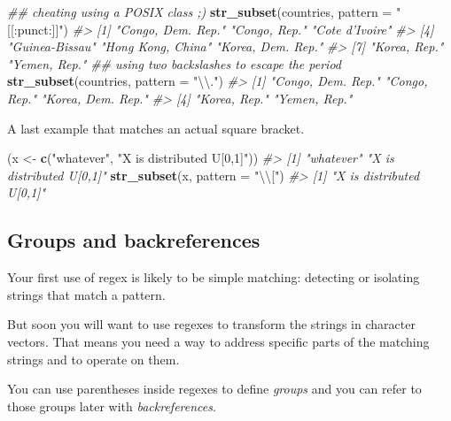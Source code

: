 \documentclass[
]{book}
\newenvironment{Shaded}{\begin{snugshade}}{\end{snugshade}}
\newcommand{\CharTok}[1]{\textcolor[rgb]{0.31,0.60,0.02}{#1}}
\newcommand{\CommentTok}[1]{\textcolor[rgb]{0.56,0.35,0.01}{\textit{#1}}}
\newcommand{\DataTypeTok}[1]{\textcolor[rgb]{0.13,0.29,0.53}{#1}}
\newcommand{\KeywordTok}[1]{\textcolor[rgb]{0.13,0.29,0.53}{\textbf{#1}}}
\newcommand{\NormalTok}[1]{#1}
\newcommand{\StringTok}[1]{\textcolor[rgb]{0.31,0.60,0.02}{#1}}
\begin{document}
\begin{Shaded}
\begin{Highlighting}[]
\CommentTok{## cheating using a POSIX class ;)}
\KeywordTok{str_subset}\NormalTok{(countries, }\DataTypeTok{pattern =} \StringTok{"[[:punct:]]"}\NormalTok{)}
\CommentTok{#> [1] "Congo, Dem. Rep." "Congo, Rep."      "Cote d'Ivoire"   }
\CommentTok{#> [4] "Guinea-Bissau"    "Hong Kong, China" "Korea, Dem. Rep."}
\CommentTok{#> [7] "Korea, Rep."      "Yemen, Rep."}
\CommentTok{## using two backslashes to escape the period}
\KeywordTok{str_subset}\NormalTok{(countries, }\DataTypeTok{pattern =} \StringTok{"}\CharTok{\textbackslash{}\textbackslash{}}\StringTok{."}\NormalTok{)}
\CommentTok{#> [1] "Congo, Dem. Rep." "Congo, Rep."      "Korea, Dem. Rep."}
\CommentTok{#> [4] "Korea, Rep."      "Yemen, Rep."}
\end{Highlighting}
\end{Shaded}

A last example that matches an actual square bracket.

\begin{Shaded}
\begin{Highlighting}[]
\NormalTok{(x <-}\StringTok{ }\KeywordTok{c}\NormalTok{(}\StringTok{"whatever"}\NormalTok{, }\StringTok{"X is distributed U[0,1]"}\NormalTok{))}
\CommentTok{#> [1] "whatever"                "X is distributed U[0,1]"}
\KeywordTok{str_subset}\NormalTok{(x, }\DataTypeTok{pattern =} \StringTok{"}\CharTok{\textbackslash{}\textbackslash{}}\StringTok{["}\NormalTok{)}
\CommentTok{#> [1] "X is distributed U[0,1]"}
\end{Highlighting}
\end{Shaded}

\hypertarget{groups-and-backreferences}{%
\subsection{Groups and backreferences}\label{groups-and-backreferences}}

Your first use of regex is likely to be simple matching: detecting or isolating strings that match a pattern.

But soon you will want to use regexes to transform the strings in character vectors. That means you need a way to address specific parts of the matching strings and to operate on them.

You can use parentheses inside regexes to define \emph{groups} and you can refer to those groups later with \emph{backreferences}.
\end{document}
